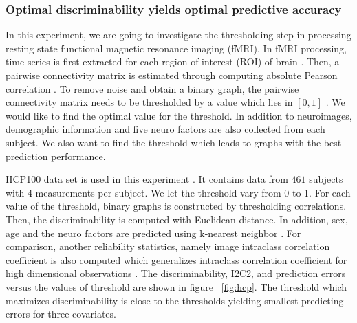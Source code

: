 \documentclass{article}
\begin{document}
\subsubsection{Optimal discriminability yields optimal predictive accuracy}
In this experiment, we are going to investigate the thresholding step in processing resting state functional magnetic resonance imaging (fMRI). In fMRI processing, time series is first extracted for each region of interest (ROI) of brain \cite{strother2006evaluating}. Then, a pairwise connectivity matrix is estimated through computing absolute Pearson correlation \cite{liang2012effects}. To remove noise and obtain a binary graph, the pairwise connectivity matrix needs to be thresholded by a value which lies in $[0,1]$ \cite{hampson2002detection,van2010exploring}. We would like to find the optimal value for the threshold. In addition to neuroimages, demographic information and five neuro factors \cite{costa1992revised} are also collected from each subject. We also want to find the threshold which leads to graphs with the best prediction performance.  

HCP100 data set is used in this experiment \cite{van2012human}. It contains data from $461$ subjects with $4$ measurements per subject. We let the threshold vary from 0 to 1. For each value of the threshold, binary graphs is constructed by thresholding correlations. Then, the discriminability is computed with Euclidean distance. In addition, sex, age and the neuro factors are predicted using k-nearest neighbor \cite{vapnik1998statistical}. For comparison, another reliability statistics, namely image intraclass correlation coefficient is also computed which generalizes intraclass correlation coefficient for high dimensional observations \cite{shou2013quantifying}. The discriminability, I2C2, and prediction errors versus the values of threshold are shown in figure ~\ref{fig:hcp}. The threshold which maximizes discriminability is close to the thresholds yielding smallest predicting errors for three covariates. 
\end{document}
